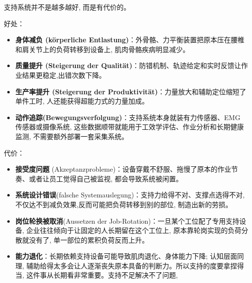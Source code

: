 支持系统并不是越多越好, 而是有代价的。

好处：
\begin{itemize}
    \item \textbf{身体减负 (körperliche Entlastung)}：外骨骼、力平衡装置把原本压在腰椎和肩关节上的负荷转移到设备上, 肌肉骨骼疾病明显减少。
    \item \textbf{质量提升 (Steigerung der Qualität)}：防错机制、轨迹给定和实时反馈让作业结果更稳定,出错次数下降。
    \item \textbf{生产率提升 (Steigerung der Produktivität)}：力量放大和辅助定位缩短了单件工时, 人还能获得超能力式的力量加成。
    \item \textbf{动作追踪(Bewegungsverfolgung)}：支持系统本身就装有力传感器、EMG 传感器或摄像系统, 这些数据顺带就能用于工效学评估、作业分析和长期健康监测, 不需要额外部署一套采集系统。
\end{itemize}

代价：
\begin{itemize}
    \item \textbf{接受度问题} (Akzeptanzprobleme)：设备穿戴不舒服、拖慢了原本的作业节奏、或者让员工觉得自己被监视, 都会导致系统被闲置。
    \item \textbf{系统设计错误}(falsche Systemauslegung)：支持力给得不对、支撑点选得不对, 不仅达不到减负效果,反而可能把负荷转移到别的部位, 制造出新的劳损。
    \item \textbf{岗位轮换被取消}(Aussetzen der Job-Rotation)：一旦某个工位配了专用支持设备, 企业往往倾向于让固定的人长期留在这个工位上, 原本靠轮岗实现的负荷分散就没有了, 单一部位的累积负荷反而上升。
    \item \textbf{能力退化}：长期依赖支持设备可能导致肌肉退化、身体能力下降; 认知层面同理, 辅助给得太多会让人逐渐丧失原本具备的判断力。所以支持的度要拿捏得当, 这件事从长期看非常重要。支持不足解决不了问题,
\end{itemize}

